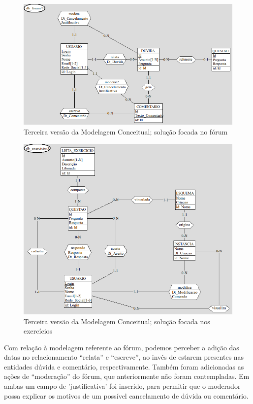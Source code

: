 \documentclass[graduacao,brazil]{ThesisPUC}
\begin{document}
\begin{figure}[H]
    \centering
    \includegraphics[width=\linewidth]{Imagens/ModelagemConceitual_forum_v2_0.png}
    \caption{Terceira vers\~{a}o da Modelagem Conceitual; solu\c{c}\~{a}o focada no f\'{o}rum}
\end{figure}

\begin{figure}[H]
    \centering
    \includegraphics[width=\linewidth]{Imagens/ModelagemConceitual_exercicio_v2_0.png}
    \caption{Terceira vers\~{a}o da Modelagem Conceitual; solu\c{c}\~{a}o focada nos exerc\'{i}cios}
\end{figure}

Com rela\c{c}\~{a}o \`{a} modelagem referente ao f\'{o}rum, podemos perceber a adi\c{c}\~{a}o das datas no
relacionamento “relata” e “escreve”, ao inv\'{e}s de estarem presentes nas entidades d\'{u}vida e
coment\'{a}rio, respectivamente. Tamb\'{e}m foram adicionadas as a\c{c}\~{o}es de “modera\c{c}\~{a}o” do f\'{o}rum,
que anteriormente n\~{a}o foram contempladas. Em ambas um campo de 'justificativa' foi inserido,
para permitir que o moderador possa explicar os motivos de um poss\'{i}vel cancelamento de d\'{u}vida
ou coment\'{a}rio.
\end{document}
